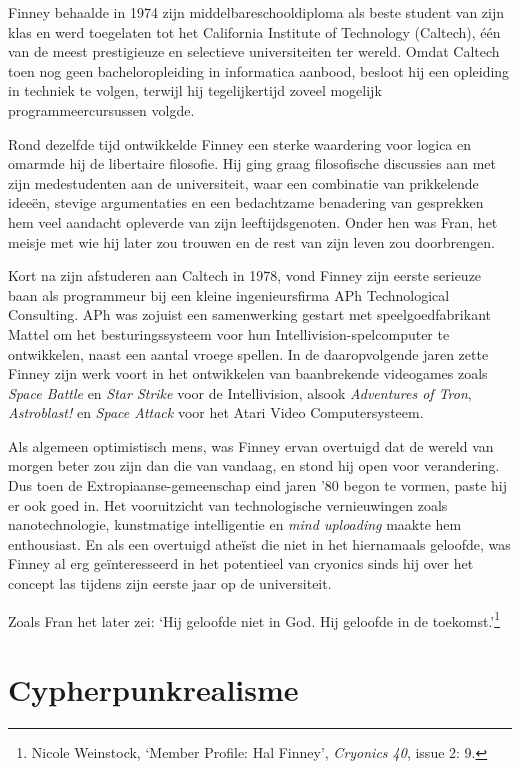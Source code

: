 \documentclass[
  a5paper,
  smalldemyvopaper,11pt,twoside,onecolumn,openright,extrafontsizes]{memoir}
\begin{document}
Finney behaalde in 1974 zijn middelbareschooldiploma als beste student
van zijn klas en werd toegelaten tot het California Institute of
Technology (Caltech), één van de meest prestigieuze en selectieve
universiteiten ter wereld. Omdat Caltech toen nog geen bacheloropleiding
in informatica aanbood, besloot hij een opleiding in techniek te volgen,
terwijl hij tegelijkertijd zoveel mogelijk programmeercursussen volgde.

Rond dezelfde tijd ontwikkelde Finney een sterke waardering voor logica
en omarmde hij de libertaire filosofie. Hij ging graag filosofische
discussies aan met zijn medestudenten aan de universiteit, waar een
combinatie van prikkelende ideeën, stevige argumentaties en een
bedachtzame benadering van gesprekken hem veel aandacht opleverde van
zijn leeftijdsgenoten. Onder hen was Fran, het meisje met wie hij later
zou trouwen en de rest van zijn leven zou doorbrengen.

Kort na zijn afstuderen aan Caltech in 1978, vond Finney zijn eerste
serieuze baan als programmeur bij een kleine ingenieursfirma APh
Technological Consulting. APh was zojuist een samenwerking gestart met
speelgoedfabrikant Mattel om het besturingssysteem voor hun
Intellivision-spelcomputer te ontwikkelen, naast een aantal vroege
spellen. In de daaropvolgende jaren zette Finney zijn werk voort in het
ontwikkelen van baanbrekende videogames zoals \emph{Space Battle} en
\emph{Star Strike} voor de Intellivision, alsook \emph{Adventures of
Tron}, \emph{Astroblast!} en \emph{Space Attack} voor het Atari Video
Computersysteem.

Als algemeen optimistisch mens, was Finney ervan overtuigd dat de wereld
van morgen beter zou zijn dan die van vandaag, en stond hij open voor
verandering. Dus toen de Extropiaanse-gemeenschap eind jaren '80 begon
te vormen, paste hij er ook goed in. Het vooruitzicht van technologische
vernieuwingen zoals nanotechnologie, kunstmatige intelligentie en
\emph{mind uploading} maakte hem enthousiast. En als een overtuigd
atheïst die niet in het hiernamaals geloofde, was Finney al erg
geïnteresseerd in het potentieel van cryonics sinds hij over het concept
las tijdens zijn eerste jaar op de universiteit.

Zoals Fran het later zei: `Hij geloofde niet in God. Hij geloofde in de
toekomst.'\footnote{Nicole Weinstock, `Member Profile: Hal Finney',
  \emph{Cryonics 40}, issue 2: 9.}

\section{Cypherpunkrealisme}\label{cypherpunkrealisme}
\end{document}
